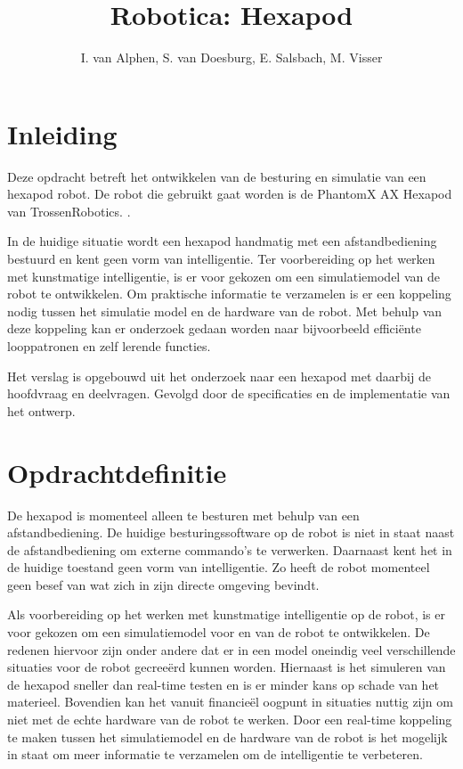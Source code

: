 \documentclass[10pt,a4paper]{article}
\title{Robotica: Hexapod}
\author{I. van Alphen, S. van Doesburg, E.  Salsbach, M. Visser}
\begin{document}
\maketitle
\newpage

\tableofcontents
\newpage

\section{Inleiding}
Deze opdracht betreft het ontwikkelen van de besturing en simulatie van een hexapod robot.\cite{beroepsopdrachten} De robot die gebruikt gaat worden is de PhantomX AX Hexapod van TrossenRobotics. \cite{PhantomX AX Hexapod Kit}.

In de huidige situatie wordt een hexapod handmatig met een afstandbediening bestuurd en kent geen vorm van intelligentie. Ter voorbereiding op het werken met kunstmatige intelligentie, is er voor gekozen om een simulatiemodel van de robot te ontwikkelen. Om praktische informatie te verzamelen is er een koppeling nodig tussen het simulatie model en de hardware van de robot. Met behulp van deze koppeling kan er onderzoek gedaan worden naar bijvoorbeeld effici\"ente looppatronen en zelf lerende functies.

Het verslag is opgebouwd uit het onderzoek naar een hexapod met daarbij de hoofdvraag en deelvragen. Gevolgd door de specificaties en de implementatie van het ontwerp.

\newpage

\section{Opdrachtdefinitie} 
De hexapod is momenteel alleen te besturen met behulp van een afstandbediening. De huidige besturingssoftware op de robot is niet in staat naast de afstandbediening om externe commando's te verwerken. Daarnaast kent het in de huidige toestand geen vorm van intelligentie. Zo heeft de robot momenteel geen besef van wat zich in zijn directe omgeving bevindt.

Als voorbereiding op het werken met kunstmatige intelligentie op de robot, is er voor gekozen om een simulatiemodel voor en van de robot te ontwikkelen. De redenen hiervoor zijn onder andere dat er in een model oneindig veel verschillende situaties voor de robot gecree\"erd kunnen worden. Hiernaast is het simuleren van de hexapod sneller dan real-time testen en is er minder kans op schade van het materieel. Bovendien kan het vanuit financie\"el oogpunt in situaties nuttig zijn om niet met de echte hardware van de robot te werken. 
Door een real-time koppeling te maken tussen het simulatiemodel en de hardware van de robot is het mogelijk in staat om meer informatie te verzamelen om de intelligentie te verbeteren.
\end{document}

